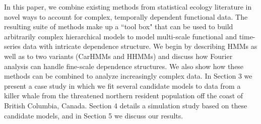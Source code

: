 In this paper, we combine existing methods from statistical ecology literature in novel ways to account for complex, temporally dependent functional data. The resulting suite of methods make up a ``tool box" that can be used to build arbitrarily complex hierarchical models to model multi-scale functional and time-series data with intricate dependence structure.
We begin by describing HMMs as well as to two variants (CarHMMs and HHMMs) and discuss how Fourier analysis can handle fine-scale dependence structures. We also show how these methods can be combined to analyze increasingly complex data. In Section 3 we present a case study in which we fit several candidate models to data from a killer whale from the threatened northern resident population off the coast of British Columbia, Canada. Section 4 details a simulation study based on these candidate models, and in Section 5 we discuss our results.